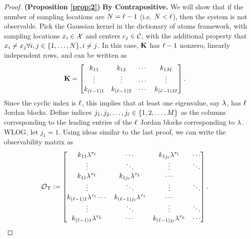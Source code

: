 \begin{proof}
\textbf{(Proposition \ref{prop:2})}
\textbf{By Contrapositive.} We will show that if the number of sampling locations are $ N=\ell-1 $ (i.e. $ N < \ell$), then the system is not observable. Pick the Gaussian kernel in the dictionary of atoms framework,
with sampling locations $x_i\in\mathcal{X}$ and centers $c_j\in\mathcal{C}$, with the additional 
property that $x_i\neq x_j \forall i,j\in\{1,\dots,N\}, i\neq j$.
In this case, 
$\mathbf{K}$ has $\ell-1$ nonzero, linearly independent rows, and can be written as
\begin{align*}
\mathbf{K} &= \begin{bmatrix}
k_{11} & k_{12} & \cdots & k_{1M} \\
\vdots & \vdots & \cdots & \vdots \\
k_{(\ell-1)1} & k_{(\ell-1)2} & \cdots & k_{(\ell-1)M} 
\end{bmatrix}.
\end{align*}
Since the cyclic index is $\ell$, this implies that at least one eigenvalue, say $\lambda$, has $\ell$ Jordan 
blocks. 
	Define indices $j_1, j_2, \dots, j_{\ell} \in \{1,2,\dots,M\}$ as the columns corresponding to the leading entries of the $\ell$ Jordan blocks corresponding to $\lambda$. WLOG, let $j_1 = 1$.
	Using ideas similar to the last proof, we can write the observability matrix as
	\begin{align*}
	\mathcal{O}_{\Upsilon}
	&:= 
	\begin{bmatrix}
	k_{11}\lambda^{\tau_1}  & \cdots & k_{1j_{\ell}}\lambda^{\tau_1} & \cdots\\
	\vdots & \ddots &\vdots & \ddots\\
	k_{11}\lambda^{\tau_{L}}  & k_{1j_{\ell}}\lambda^{\tau_{L}} & \cdots\\
	\vdots & \ddots & \vdots & \ddots\\
	k_{(\ell-1)1}\lambda^{\tau_1}  \cdots & k_{(\ell-1)j_{\ell}}\lambda^{\tau_1} & \cdots\\
	\vdots & \ddots &\vdots & \ddots\\
	k_{(\ell-1)1}\lambda^{\tau_{L}}  & \cdots & k_{(\ell-1)j_{\ell}}\lambda^{\tau_{L}} & \cdots
	\end{bmatrix}.
	\end{align*}

\end{proof}
